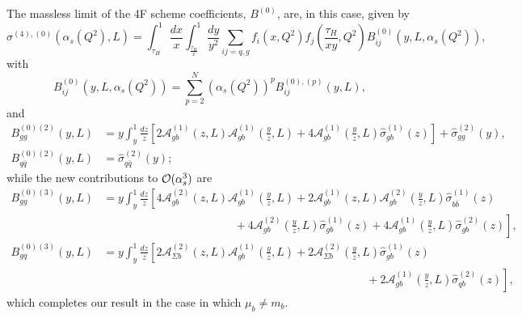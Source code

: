 \documentclass[12pt]{article}
\newcommand{\order}[1]{{\cal O}(#1)}
\begin{document}
\begin{appendix}
  The massless limit of the 4F scheme coefficients, $B^{(0)}$, are, in this case, given by
  \begin{equation}
    \label{eq:massless_lim}
    \sigma^{(4),(0)}\left(\alpha_s(Q^2),L\right)=\int_{\tau_H}^{1} \frac{dx}{x}\int_{\frac{\tau_H}{x}}^{1} \frac{dy}
          {y^2}\sum_{ij=q,g}f_{i}(x,Q^2)f_j\left(\frac{\tau_H}{x y},Q^2\right)B_{ij}^{(0)}\left(y,L,\alpha_s(Q^2)\right),
  \end{equation}
  with
  \begin{equation}
    B_{ij}^{(0)}\left(y,L,\alpha_s(Q^2)\right) = \sum_{p=2}^N\left(\alpha_s(Q^2)\right)^pB_{ij}^{(0),(p)}\left(y,L\right),
  \end{equation}
  and
  \begin{align}
    B_{gg}^{(0)(2)} (y,L) & = y\int_y^1\frac{dz}{z}\left[2\mathcal{A}_{gb}^{(1)}\left(z,L\right)\mathcal{A}_{gb}^{(1)}\left(\frac{y}{z},L\right) + 4\mathcal{A}_{gb}^{(1)}\left(\frac{y}{z},L\right)\hat{\sigma}_{gb}^{(1)}(z)\right] + \hat{\sigma}_{gg}^{(2)}(y), \\
    B_{q\bar{q}}^{(0)(2)} (y,L) &= \hat{\sigma}_{q\bar{q}}^{(2)}(y);
  \end{align}
  while the new contributions to  $\order{\alpha_s^3}$ are
  \begin{align}\label{eq:subtrexp}
    B_{gg}^{(0)(3)} (y,L) & = y\int_y^1\frac{dz}{z}\left[4\mathcal{A}_{gb}^{(2)}\left(z,L\right)\mathcal{A}_{gb}^{(1)}\left(\frac{y}{z},L\right) + 2\mathcal{A}_{gb}^{(1)}\left(z,L\right)\mathcal{A}_{gb}^{(2)}\left(\frac{y}{z},L\right)\hat{\sigma}_{b\bar{b}}^{(1)}(z) \right.\nonumber \\
      & \left.\phantom{asdfdy\int_y^1\frac{dz}{z}4\mathcal{A}_{gb}^{(2)}\left(z,L\right)}+ 4\mathcal{A}_{gb}^{(2)}\left(\frac{y}{z},L\right)\hat{\sigma}_{gb}^{(1)}(z) + 4\mathcal{A}_{gb}^{(1)}\left(\frac{y}{z},L\right)\hat{\sigma}_{gb}^{(2)}(z)\right], \\
    B_{gq}^{(0)(3)} (y,L)  & =  y\int_y^1\frac{dz}{z}\left[2\mathcal{A}_{\Sigma b}^{(2)}\left(z,L\right)\mathcal{A}_{gb}^{(1)}\left(\frac{y}{z},L\right) + 2\mathcal{A}_{\Sigma b}^{(2)}\left(\frac{y}{z},L\right)\hat{\sigma}_{gb}^{(1)}(z) \right.\nonumber \\
      & \left.\phantom{asdfdy\int_y^1\frac{dz}{z}  4 \mathcal{A}_{gb}^{(2)}\left(z,L\right)\mathcal{A}_{gb}^{(1)}\left(\frac{y}{z},L\right)\mathcal{A}_{gb}^{(1)}\left(\frac{y}{z},L\right)}+ 2\mathcal{A}_{gb}^{(1)}\left(\frac{y}{z},L\right)\hat{\sigma}_{qb}^{(2)}(z)\right],
  \end{align}
  which completes our result in the case in which $\mu_b\neq m_b$.
\end{appendix}
\renewcommand{\em}{}


%
\end{document}
